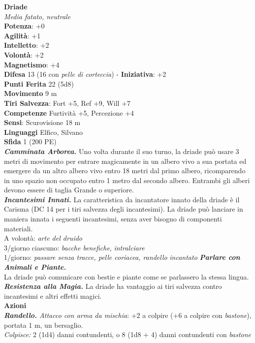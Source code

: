 \begin{multicols}{2}
\medskip\textbf{Driade}\\
\emph{Media fatato, neutrale}\\
\textbf{Potenza}: +0\\
\textbf{Agilità}: +1\\
\textbf{Intelletto}: +2\\
\textbf{Volontà}: +2\\
\textbf{Magnetismo}: +4\\
\textbf{Difesa} 13 (16 con \emph{pelle di corteccia}) - \textbf{Iniziativa}: +2\\
\textbf{Punti Ferita} 22 (5d8)\\
\textbf{Movimento} 9 m\\
\textbf{Tiri Salvezza}: Fort +5, Ref +9, Will +7\\
\textbf{Competenze} Furtività +5, Percezione +4\\
\textbf{Sensi}: Scurovisione 18 m\\
\textbf{Linguaggi} Elfico, Silvano\\
\textbf{Sfida} 1 (200 PE)\smallskip\\
\emph{\textbf{Camminata Arborea.}} Uno volta durante il suo turno, la driade può usare 3 metri di movimento per entrare magicamente in un albero vivo a sua portata ed emergere da un altro albero vivo entro 18 metri dal primo albero, ricomparendo in uno spazio non occupato entro 1 metro dal secondo albero. Entrambi gli alberi devono essere di taglia Grande o superiore.\\
\emph{\textbf{Incantesimi Innati.}} La caratteristica da incantatore innato della driade è il Carisma (DC 14 per i tiri salvezza degli incantesimi). La driade può lanciare in maniera innata i seguenti incantesimi, senza aver bisogno di componenti materiali.\\
A volontà: \emph{arte del druido}\\
3/giorno ciascuno: \emph{bacche benefiche}, \emph{intralciare}\\
1/giorno: \emph{passare senza tracce, pelle coriacea, randello} \emph{incantato} \emph{\textbf{Parlare con Animali e Piante.}}\\
La driade può comunicare con bestie e piante come se parlassero la stessa lingua.\\
\emph{\textbf{Resistenza alla Magia.}} La driade ha vantaggio ai tiri salvezza contro incantesimi e altri effetti magici.\\
\smallskip\textbf{Azioni}\\
\emph{\textbf{Randello.} Attacco con arma da mischia}: +2 a colpire (+6 a colpire con \emph{bastone}), portata 1 m, un bersaglio.\\
\emph{Colpisce:} 2 (1d4) danni contundenti, o 8 (1d8 + 4) danni contundenti con \emph{bastone}\\


\end{multicols}
